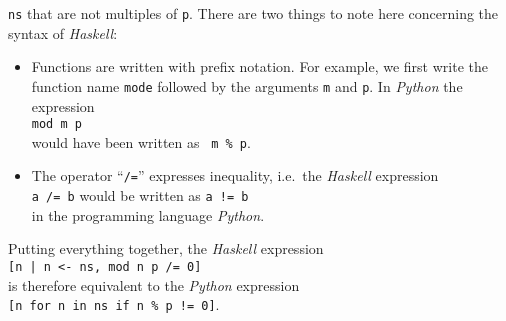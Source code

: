\begin{enumerate}[(a)]
\begin{enumerate}[1.]
    \texttt{ns} that are not multiples of \texttt{p}.  There are two things to note here concerning the syntax
    of \textsl{Haskell}:
    \begin{itemize}
    \item Functions are written with prefix notation.  For example, we first write the function name
      \texttt{mode} followed by the arguments \texttt{m} and \texttt{p}.  In \textsl{Python} the expression
      \\[0.2cm]
      \hspace*{1.3cm}
      \texttt{mod m p}
      \\[0.2cm]
      would have been written as \ \texttt{m \% p}.
    \item The operator ``\texttt{/=}'' expresses inequality, i.e.~the \textsl{Haskell} expression
      \\[0.2cm]
      \hspace*{1.3cm}
      \texttt{a /= b} \qquad would be written as \qquad \texttt{a != b} 
      \\[0.2cm]
      in the programming language \textsl{Python}.
    \end{itemize}
    Putting everything together, the \textsl{Haskell} expression 
    \\[0.2cm]
    \hspace*{1.3cm}
    \texttt{[n | n <- ns, mod n p /= 0]}
    \\[0.2cm]
    is therefore equivalent to the \textsl{Python} expression
    \\[0.2cm]
    \hspace*{1.3cm}
    \texttt{[n for n in ns if n \% p != 0]}.
  \end{enumerate}
\end{enumerate}


